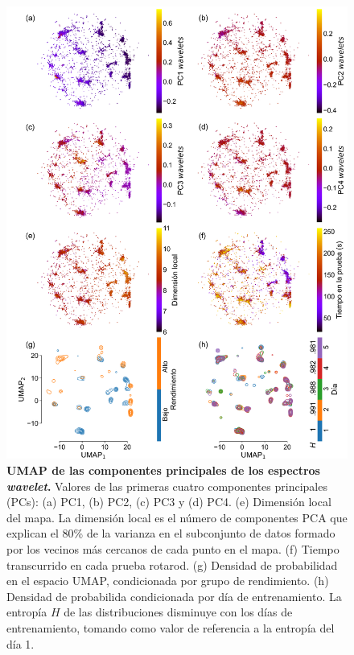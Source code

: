 \begin{appendix}
    \begin{figure}[htbp]
        \centering
        \includegraphics[width=0.9\linewidth]{figuras/capitulo4/umap_wav.png}
        \caption{\textbf{UMAP de las componentes principales de los espectros \textit{wavelet}.} Valores de las primeras cuatro componentes principales (PCs): (a) PC1, (b) PC2, (c) PC3 y (d) PC4. (e) Dimensión local del mapa. La dimensión local es el número de componentes PCA que explican el 80\% de la varianza en el subconjunto de datos formado por los vecinos más cercanos de cada punto en el mapa. (f) Tiempo transcurrido en cada prueba rotarod. (g) Densidad de probabilidad  en el espacio UMAP, condicionada por grupo de rendimiento. (h) Densidad de probabilida condicionada por día de entrenamiento. La entropía $H$ de las distribuciones disminuye con los días de entrenamiento, tomando como valor de referencia a la entropía del día 1.}
        \label{fig:capitulo4_umap_wav}
    \end{figure}


\end{appendix}
